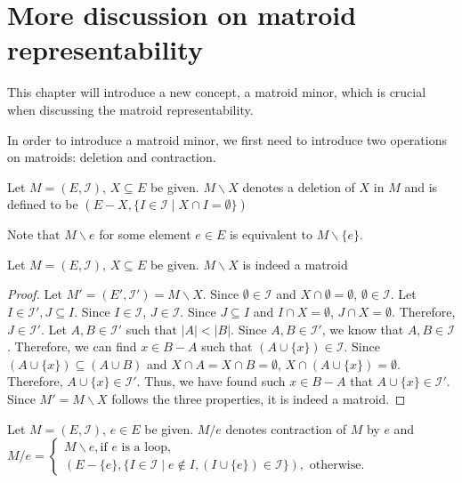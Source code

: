 \section{More discussion on matroid representability}
This chapter will introduce a new concept, a matroid minor, which is crucial when discussing the matroid representability.

In order to introduce a matroid minor, we first need to introduce two operations on matroids: deletion and contraction.

\begin{defn}
Let $M = (E, \mathcal{I})$, $X \subseteq E$ be given.
$M \backslash X$ denotes a deletion of $X$ in $M$ and is defined to be $(E - X, \{ I \in \mathcal{I} \mid X \cap I = \emptyset \})$
\end{defn}

Note that $M \backslash e$ for some element $e \in E$ is equivalent to $M \backslash \{ e \}$.

\begin{thm}
Let $M = (E, \mathcal{I})$, $X \subseteq E$ be given.
$M \backslash X$ is indeed a matroid
\end{thm}

\begin{proof}
Let $M' = (E', \mathcal{I}') = M \backslash X$.
Since $\emptyset \in \mathcal{I}$ and $X \cap \emptyset = \emptyset$, $\emptyset \in \mathcal{I}$.
Let $I \in \mathcal{I}', J \subseteq I$. 
Since $I \in \mathcal{I}$, $J \in \mathcal{I}$.
Since $J \subseteq I$ and $I \cap X = \emptyset$, $J \cap X = \emptyset$.
Therefore, $J \in \mathcal{I}'$.
Let $A, B \in \mathcal{I}'$ such that $\lvert A \rvert < \lvert B \rvert$.
Since $A, B \in \mathcal{I}'$, we know that $A, B \in \mathcal{I}$.
Therefore, we can find $x \in B - A$ such that $(A \cup \{ x \}) \in \mathcal{I}$.
Since $(A \cup \{ x \}) \subseteq (A \cup B)$ and $X \cap A = X \cap B = \emptyset$, $X \cap (A \cup \{ x \}) = \emptyset$.
Therefore, $A \cup \{ x \} \in \mathcal{I}'$.
Thus, we have found such $x \in B - A$ that $A \cup \{ x \} \in \mathcal{I}'$.
Since $M' = M \backslash X$ follows the three properties, it is indeed a matroid. 
\end{proof}

\begin{defn}
Let $M = (E, \mathcal{I})$, $e \in E$ be given.
$M / e$ denotes contraction of $M$ by $e$ and 
$M / e = \begin{cases}
      M \backslash e, \text{if $e$ is a loop},\\
      (E - \{ e \}, \{ I \in \mathcal{I} \mid e \notin I, (I \cup \{ e \}) \in \mathcal{I}\}), \text{ otherwise}.
         \end{cases}$
\end{defn}


